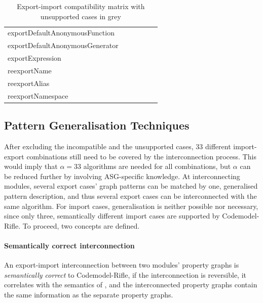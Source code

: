 \begin{table}[!htb]
\begin{tabular}{l|cccgg}
		{exportDefaultAnonymousFunction}		& \nop & \nop & \yep & \nop & \yep \\
		\rowcolor{grey}
		{exportDefaultAnonymousGenerator}		& \nop & \nop & \yep & \nop & \yep \\
		{exportExpression}									& \nop & \nop & \nop & \nop & \yep \\
		{reexportName}											& \yep & \yep & \nop & \yep & \yep \\
		\rowcolor{grey}
		{reexportAlias}											& \yep & \yep & \nop & \yep & \yep \\
		{reexportNamespace}									& \yep & \yep & \yep & \yep & \yep \\
		\hline
	\end{tabular}

	\caption{Export-import compatibility matrix with unsupported cases in grey}
	\label{table:export-import-compatibility}
\end{table}


\subsection{Pattern Generalisation Techniques}

After excluding the incompatible and the unsupported cases, $33$ different import-export combinations still need to be covered by the interconnection process. This would imply that $\alpha = 33$ algorithms are needed for all combinations, but $\alpha$ can be reduced further by involving ASG-specific knowledge. At interconnecting modules, several export cases' graph patterns can be matched by one, generalised pattern description, and thus several export cases can be interconnected with the same algorithm. For import cases, generalisation is neither possible nor necessary, since only three, semantically different import cases are supported by Codemodel-Rifle. To proceed, two concepts are defined.

\paragraph{Semantically correct interconnection}

An export-import interconnection between two modules' property graphs is \emph{semantically correct} to Codemodel-Rifle, if the interconnection is reversible, it correlates with the semantics of \es, and the interconnected property graphs contain the same information as the separate property graphs.

